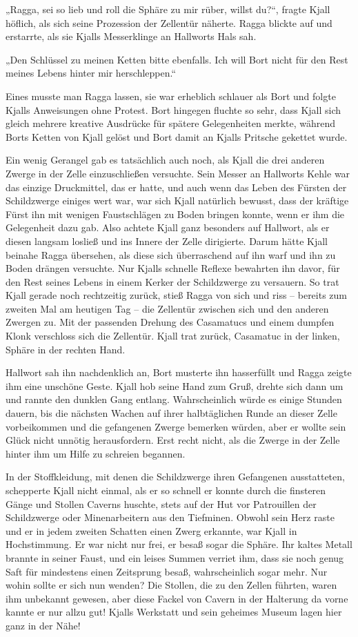 „Ragga, sei so lieb und roll die Sphäre zu mir rüber, willst du?“, fragte Kjall höflich, als sich seine Prozession der Zellentür näherte. Ragga blickte auf und erstarrte, als sie Kjalls Messerklinge an Hallworts Hals sah.

„Den Schlüssel zu meinen Ketten bitte ebenfalls. Ich will Bort nicht für den Rest meines Lebens hinter mir herschleppen.“

Eines musste man Ragga lassen, sie war erheblich schlauer als Bort und folgte Kjalls Anweisungen ohne Protest. Bort hingegen fluchte so sehr, dass Kjall sich gleich mehrere kreative Ausdrücke für spätere Gelegenheiten merkte, während Borts Ketten von Kjall gelöst und Bort damit an Kjalls Pritsche gekettet wurde.

Ein wenig Gerangel gab es tatsächlich auch noch, als Kjall die drei anderen Zwerge in der Zelle einzuschließen versuchte. Sein Messer an Hallworts Kehle war das einzige Druckmittel, das er hatte, und auch wenn das Leben des Fürsten der Schildzwerge einiges wert war, war sich Kjall natürlich bewusst, dass der kräftige Fürst ihn mit wenigen Faustschlägen zu Boden bringen konnte, wenn er ihm die Gelegenheit dazu gab. Also achtete Kjall ganz besonders auf Hallwort, als er diesen langsam losließ und ins Innere der Zelle dirigierte. Darum hätte Kjall beinahe Ragga übersehen, als diese sich überraschend auf ihn warf und ihn zu Boden drängen versuchte. Nur Kjalls schnelle Reflexe bewahrten ihn davor, für den Rest seines Lebens in einem Kerker der Schildzwerge zu versauern. So trat Kjall gerade noch rechtzeitig zurück, stieß Ragga von sich und riss – bereits zum zweiten Mal am heutigen Tag – die Zellentür zwischen sich und den anderen Zwergen zu. Mit der passenden Drehung des Casamatucs und einem dumpfen Klonk verschloss sich die Zellentür. Kjall trat zurück, Casamatuc in der linken, Sphäre in der rechten Hand.

Hallwort sah ihn nachdenklich an, Bort musterte ihn hasserfüllt und Ragga zeigte ihm eine unschöne Geste. Kjall hob seine Hand zum Gruß, drehte sich dann um und rannte den dunklen Gang entlang. Wahrscheinlich würde es einige Stunden dauern, bis die nächsten Wachen auf ihrer halbtäglichen Runde an dieser Zelle vorbeikommen und die gefangenen Zwerge bemerken würden, aber er wollte sein Glück nicht unnötig herausfordern. Erst recht nicht, als die Zwerge in der Zelle hinter ihm um Hilfe zu schreien begannen.

In der Stoffkleidung, mit denen die Schildzwerge ihren Gefangenen ausstatteten, schepperte Kjall nicht einmal, als er so schnell er konnte durch die finsteren Gänge und Stollen Caverns huschte, stets auf der Hut vor Patrouillen der Schildzwerge oder Minenarbeitern aus den Tiefminen. Obwohl sein Herz raste und er in jedem zweiten Schatten einen Zwerg erkannte, war Kjall in Hochstimmung. Er war nicht nur frei, er besaß sogar die Sphäre. Ihr kaltes Metall brannte in seiner Faust, und ein leises Summen verriet ihm, dass sie noch genug Saft für mindestens einen Zeitsprung besaß, wahrscheinlich sogar mehr. Nur wohin sollte er sich nun wenden? Die Stollen, die zu den Zellen führten, waren ihm unbekannt gewesen, aber diese Fackel von Cavern in der Halterung da vorne kannte er nur allzu gut! Kjalls Werkstatt und sein geheimes Museum lagen hier ganz in der Nähe!

